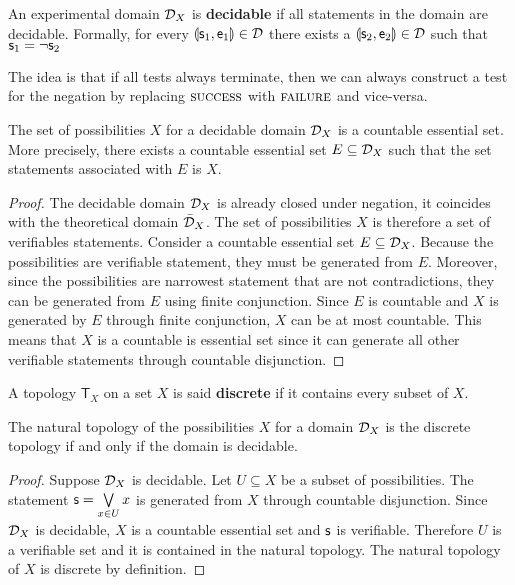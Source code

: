 \documentclass[11pt,letterpaper,fleqn]{memoir} %
\begin{document}
\begin{mathSection}
	
	\begin{defn}
		An experimental domain $\mathcal{D}_X$ is \textbf{decidable} if all statements in the domain are decidable. Formally, for every $\llparenthesis \mathsf{s}_1, \mathsf{e}_1 \rrparenthesis \in \mathcal{D}$ there exists a $\llparenthesis \mathsf{s}_2, \mathsf{e}_2 \rrparenthesis \in \mathcal{D}$ such that $\mathsf{s}_1 = \neg \mathsf{s}_2$
	\end{defn}
	
	\begin{justification}
		The idea is that if all tests always terminate, then we can always construct a test for the negation by replacing $\textsc{success}$ with $\textsc{failure}$ and vice-versa.
	\end{justification}
	
	\begin{prop}
		The set of possibilities $X$ for a decidable domain $\mathcal{D}_X$ is a countable essential set. More precisely, there exists a countable essential set $E \subseteq \mathcal{D}_X$ such that the set statements associated with $E$ is $X$.
	\end{prop}
	
	\begin{proof}
		The decidable domain $\mathcal{D}_X$ is already closed under negation, it coincides with the theoretical domain $\bar{\mathcal{D}}_X$. The set of possibilities $X$ is therefore a set of verifiables statements. Consider a countable essential set $E \subseteq \mathcal{D}_X$. Because the possibilities are verifiable statement, they must be generated from $E$. Moreover, since the possibilities are narrowest statement that are not contradictions, they can be generated from $E$ using finite conjunction. Since $E$ is countable and $X$ is generated by $E$ through finite conjunction, $X$ can be at most countable. This means that $X$ is a countable is essential set since it can generate all other verifiable statements through countable disjunction.
	\end{proof}
		
	\begin{defn}
		A topology $\mathsf{T}_X$ on a set $X$ is said \textbf{discrete} if it contains every subset of $X$.
	\end{defn}
	
\begin{thrm}\label{thrm_decidablity_is_discreteness}
	The natural topology of the possibilities $X$ for a domain $\mathcal{D}_X$ is the discrete topology if and only if the domain is decidable.
\end{thrm}
\begin{proof}
	Suppose $\mathcal{D}_X$ is decidable. Let $U \subseteq X$ be a subset of possibilities. The statement $\mathsf{s} = \bigvee\limits_{x \in U} x$ is generated from $X$ through countable disjunction. Since $\mathcal{D}_X$ is decidable, $X$ is a countable essential set and $\mathsf{s}$ is verifiable. Therefore $U$ is a verifiable set and it is contained in the natural topology. The natural topology of $X$ is discrete by definition.
	

\end{proof}
\end{mathSection}
\end{document}

